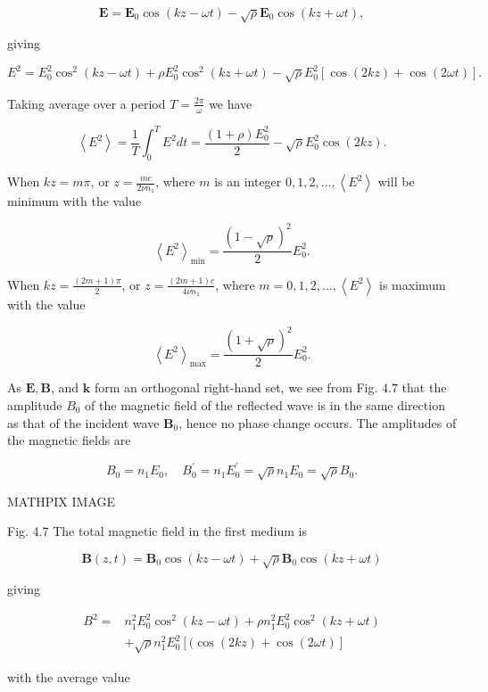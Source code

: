 \documentclass[10pt]{article}
\begin{document}
$$
\mathbf{E}=\mathbf{E}_{0} \cos (k z-\omega t)-\sqrt{\rho} \mathbf{E}_{0} \cos (k z+\omega t),
$$

giving

$$
E^{2}=E_{0}^{2} \cos ^{2}(k z-\omega t)+\rho E_{0}^{2} \cos ^{2}(k z+\omega t)-\sqrt{\rho} E_{0}^{2}[\cos (2 k z)+\cos (2 \omega t)] \text {. }
$$

Taking average over a period $T=\frac{2 \pi}{\omega}$ we have

$$
\left\langle E^{2}\right\rangle=\frac{1}{T} \int_{0}^{T} E^{2} d t=\frac{(1+\rho) E_{0}^{2}}{2}-\sqrt{\rho} E_{0}^{2} \cos (2 k z) .
$$

When $k z=m \pi$, or $z=\frac{m c}{2 \nu n_{1}}$, where $m$ is an integer $0,1,2, \ldots,\left\langle E^{2}\right\rangle$ will be minimum with the value

$$
\left\langle E^{2}\right\rangle_{\min }=\frac{(1-\sqrt{\rho})^{2}}{2} E_{0}^{2} .
$$

When $k z=\frac{(2 m+1) \pi}{2}$, or $z=\frac{(2 m+1) c}{4 \nu n_{1}}$, where $m=0,1,2, \ldots,\left\langle E^{2}\right\rangle$ is maximum with the value

$$
\left\langle E^{2}\right\rangle_{\max }=\frac{(1+\sqrt{\rho})^{2}}{2} E_{0}^{2} .
$$

 As $\mathbf{E}, \mathbf{B}$, and $\mathbf{k}$ form an orthogonal right-hand set, we see from Fig. $4.7$ that the amplitude $B_{0}$ of the magnetic field of the reflected wave is in the same direction as that of the incident wave $\mathbf{B}_{0}$, hence no phase change occurs. The amplitudes of the magnetic fields are

$$
B_{0}=n_{1} E_{0}, \quad B_{0}^{\prime}=n_{1} E_{0}^{\prime}=\sqrt{\rho} n_{1} E_{0}=\sqrt{\rho} B_{0} .
$$

MATHPIX IMAGE

Fig. 4.7 The total magnetic field in the first medium is

$$
\mathbf{B}(z, t)=\mathbf{B}_{0} \cos (k z-\omega t)+\sqrt{\rho} \mathbf{B}_{0} \cos (k z+\omega t)
$$

giving

$$
\begin{aligned}
B^{2}=& n_{1}^{2} E_{0}^{2} \cos ^{2}(k z-\omega t)+\rho n_{1}^{2} E_{0}^{2} \cos ^{2}(k z+\omega t) \\
&+\sqrt{\rho} n_{1}^{2} E_{0}^{2}[(\cos (2 k z)+\cos (2 \omega t)]
\end{aligned}
$$

with the average value
\end{document}

